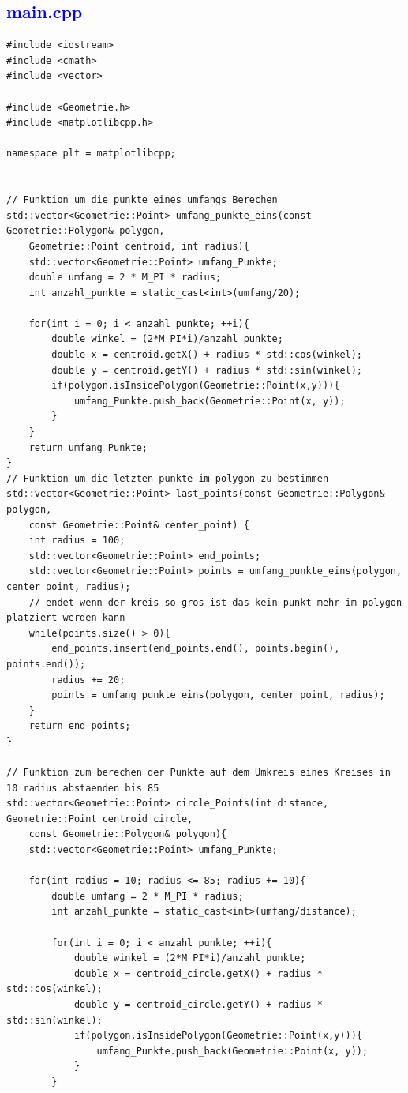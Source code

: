 \documentclass{article}
\begin{document}
\subsection{\textcolor{blue}{main.cpp}}
\begin{verbatim}
#include <iostream>
#include <cmath>
#include <vector>

#include <Geometrie.h>
#include <matplotlibcpp.h>

namespace plt = matplotlibcpp;


// Funktion um die punkte eines umfangs Berechen
std::vector<Geometrie::Point> umfang_punkte_eins(const Geometrie::Polygon& polygon,
	Geometrie::Point centroid, int radius){
	std::vector<Geometrie::Point> umfang_Punkte;
	double umfang = 2 * M_PI * radius;
	int anzahl_punkte = static_cast<int>(umfang/20);

	for(int i = 0; i < anzahl_punkte; ++i){
		double winkel = (2*M_PI*i)/anzahl_punkte;
		double x = centroid.getX() + radius * std::cos(winkel);
		double y = centroid.getY() + radius * std::sin(winkel);
		if(polygon.isInsidePolygon(Geometrie::Point(x,y))){
			umfang_Punkte.push_back(Geometrie::Point(x, y));
		}
	}
	return umfang_Punkte;
}
// Funktion um die letzten punkte im polygon zu bestimmen
std::vector<Geometrie::Point> last_points(const Geometrie::Polygon& polygon,
	const Geometrie::Point& center_point) {
	int radius = 100;
	std::vector<Geometrie::Point> end_points;
	std::vector<Geometrie::Point> points = umfang_punkte_eins(polygon, center_point, radius);
	// endet wenn der kreis so gros ist das kein punkt mehr im polygon platziert werden kann
	while(points.size() > 0){
		end_points.insert(end_points.end(), points.begin(), points.end());
		radius += 20;
		points = umfang_punkte_eins(polygon, center_point, radius);
	}
	return end_points;
}

// Funktion zum berechen der Punkte auf dem Umkreis eines Kreises in 10 radius abstaenden bis 85
std::vector<Geometrie::Point> circle_Points(int distance, Geometrie::Point centroid_circle,
	const Geometrie::Polygon& polygon){
	std::vector<Geometrie::Point> umfang_Punkte;

	for(int radius = 10; radius <= 85; radius += 10){
		double umfang = 2 * M_PI * radius;
		int anzahl_punkte = static_cast<int>(umfang/distance);

		for(int i = 0; i < anzahl_punkte; ++i){
			double winkel = (2*M_PI*i)/anzahl_punkte;
			double x = centroid_circle.getX() + radius * std::cos(winkel);
			double y = centroid_circle.getY() + radius * std::sin(winkel);
			if(polygon.isInsidePolygon(Geometrie::Point(x,y))){
				umfang_Punkte.push_back(Geometrie::Point(x, y));
			}
		}



\end{verbatim}
\end{document}

